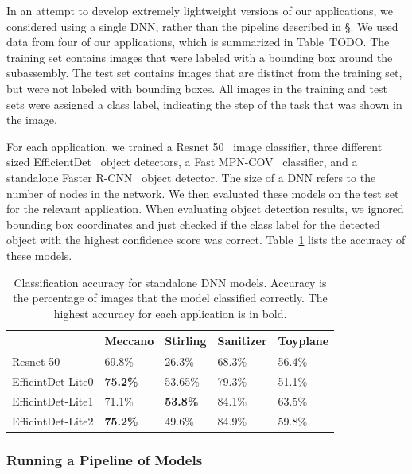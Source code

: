 In an attempt to develop extremely lightweight versions of our applications,
we considered using a single DNN, rather than the pipeline described in
\S\label{sec:two_stage}.
We used data from four of our applications, which is summarized in Table~TODO.
The training set contains images that were labeled with a bounding box around
the subassembly.
The test set contains images that are distinct from the training set, but were
not labeled with bounding boxes.
All images in the training and test sets were assigned a class label, indicating
the step of the task that was shown in the image.

For each application, we trained a Resnet 50~\cite{He2016} image classifier,
three different sized EfficientDet~\cite{Tan2020} object detectors, a
Fast MPN-COV~\cite{Li_2018_CVPR} classifier, and a standalone Faster
R-CNN~\cite{frcnn} object detector.
The size of a DNN refers to the number of nodes in the network.
We then evaluated these models on the test set for the relevant application.
When evaluating object detection results, we ignored bounding box coordinates
and just checked if the class label for the detected object with the highest
confidence score was correct.
Table~\ref{tab:standalone_accuracy} lists the accuracy of these models.

\begin{table}
\begin{tabular}{|l||l|l|l|l|}
\hline
  & Meccano & Stirling & Sanitizer & Toyplane\\
  \hline
  \hline
  Resnet 50 & 69.8\% & 26.3\% & 68.3\% & 56.4\%\\
  EfficintDet-Lite0 & \textbf{75.2\%} & 53.65\% & 79.3\% & 51.1\%\\
  EfficintDet-Lite1 & 71.1\% & \textbf{53.8\%} & 84.1\% & 63.5\%\\
  EfficintDet-Lite2 & \textbf{75.2\%} & 49.6\% & 84.9\% & 59.8\%\\
  \hline
\end{tabular}
  \caption{
    Classification accuracy for standalone DNN models.
    Accuracy is the percentage of images that the model classified correctly.
    The highest accuracy for each application is in bold.
  }\label{tab:standalone_accuracy}
\end{table}

\subsubsection{Running a Pipeline of Models}

